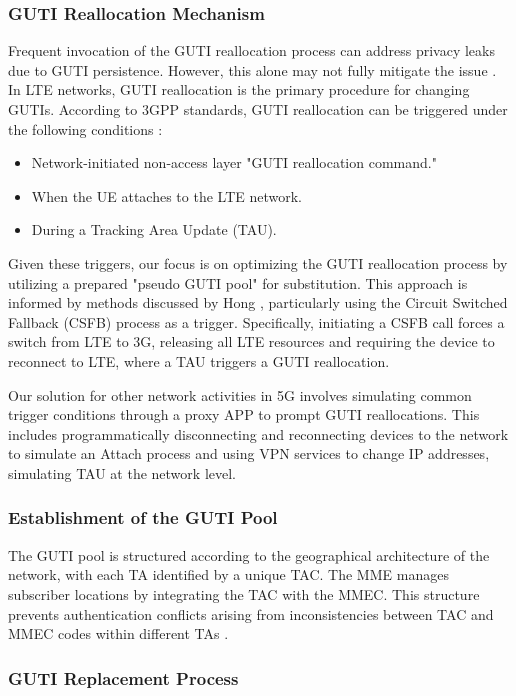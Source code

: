 \documentclass[sigplan,screen]{acmart}
\begin{document}
\subsubsection{GUTI Reallocation Mechanism}
Frequent invocation of the GUTI reallocation process can address privacy leaks due to GUTI persistence. However, this alone may not fully mitigate the issue \cite{kune2012location}. In LTE networks, GUTI reallocation is the primary procedure for changing GUTIs. According to 3GPP standards, GUTI reallocation can be triggered under the following conditions \cite{3gpp24301}:

\begin{itemize}
\item Network-initiated non-access layer "GUTI reallocation command."
\item When the UE attaches to the LTE network.
\item During a Tracking Area Update (TAU).
\end{itemize}

Given these triggers, our focus is on optimizing the GUTI reallocation process by utilizing a prepared "pseudo GUTI pool" for substitution. This approach is informed by methods discussed by Hong \cite{hong2018guti}, particularly using the Circuit Switched Fallback (CSFB) process as a trigger. Specifically, initiating a CSFB call forces a switch from LTE to 3G, releasing all LTE resources and requiring the device to reconnect to LTE, where a TAU triggers a GUTI reallocation.

Our solution for other network activities in 5G involves simulating common trigger conditions through a proxy APP to prompt GUTI reallocations. This includes programmatically disconnecting and reconnecting devices to the network to simulate an Attach process and using VPN services to change IP addresses, simulating TAU at the network level.

\subsubsection{Establishment of the GUTI Pool}
The GUTI pool is structured according to the geographical architecture of the network, with each TA identified by a unique TAC. The MME manages subscriber locations by integrating the TAC with the MMEC. This structure prevents authentication conflicts arising from inconsistencies between TAC and MMEC codes within different TAs \cite{hong2018guti}.

\subsubsection{GUTI Replacement Process}
\end{document}
